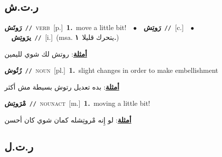 \documentclass[10pt,a4paper,twoside]{article} %
\begin{document}
\begin{multicols}{2}
\vspace{-3mm}
\subsection*{\color{blue}\foreignlanguage{arabic}{ر.ت.ش}\color{blue}{}} 

{\setlength\topsep{0pt}\textbf{\foreignlanguage{arabic}{رَوتَش}}\ {\color{gray}\texttt{//}\color{black}}\ \textsc{verb}\ [p.]\ \textbf{1.}~move a little bit!\ \ $\bullet$\ \ \setlength\topsep{0pt}\textbf{\foreignlanguage{arabic}{رَوتِش}}\ {\color{gray}\texttt{//}\color{black}}\ [c.]\ \ $\bullet$\ \ \setlength\topsep{0pt}\textbf{\foreignlanguage{arabic}{يرَوتِش}}\ {\color{gray}\texttt{//}\color{black}}\ [i.]\ \color{gray}(msa. \foreignlanguage{arabic}{يتحرك قليلا}~\foreignlanguage{arabic}{\textbf{١.}})\color{black}\  \begin{flushright}\color{gray}\foreignlanguage{arabic}{\textbf{\underline{\foreignlanguage{arabic}{أمثلة}}}: روتش لك شوي لليمين}\end{flushright}\color{black}} \vspace{2mm}

{\setlength\topsep{0pt}\textbf{\foreignlanguage{arabic}{رُتُوش}}\ {\color{gray}\texttt{//}\color{black}}\ \textsc{noun}\ [pl.]\ \textbf{1.}~slight changes in order to make embellishment\  \begin{flushright}\color{gray}\foreignlanguage{arabic}{\textbf{\underline{\foreignlanguage{arabic}{أمثلة}}}: بده تعديل رتوش بسيطة مش أكثر}\end{flushright}\color{black}} \vspace{2mm}

{\setlength\topsep{0pt}\textbf{\foreignlanguage{arabic}{مْرَوتِش}}\ {\color{gray}\texttt{//}\color{black}}\ \textsc{noun\textunderscore act}\ [m.]\ \textbf{1.}~moving a little bit!\  \begin{flushright}\color{gray}\foreignlanguage{arabic}{\textbf{\underline{\foreignlanguage{arabic}{أمثلة}}}: لو إِنه مْروتِشله كمان شوي كان أحسن}\end{flushright}\color{black}} \vspace{2mm}

\vspace{-3mm}
\subsection*{\color{blue}\foreignlanguage{arabic}{ر.ت.ل}\color{blue}{}} 


\end{multicols}
\end{document}
